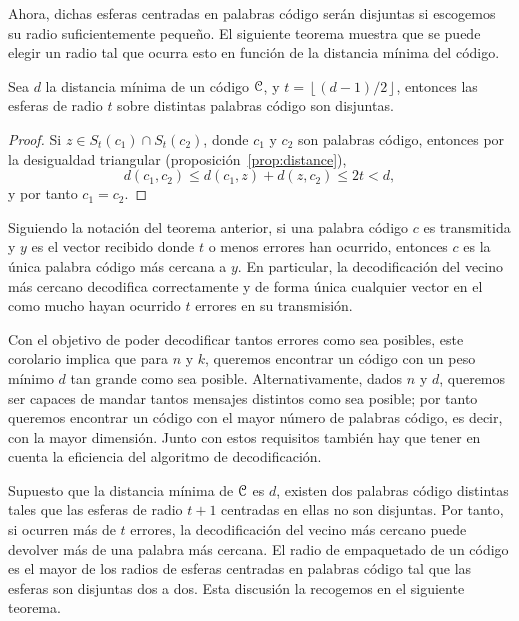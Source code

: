 Ahora, dichas esferas centradas en palabras código serán disjuntas si escogemos su radio suficientemente pequeño. El siguiente teorema muestra que se puede elegir un radio tal que ocurra esto en función de la distancia mínima del código.

\begin{theorem}
\label{th:num_of_errors}
Sea \(d\) la distancia mínima de un código \(\mathcal{C}\), y \(t = \left\lfloor (d-1) / 2 \right\rfloor\), entonces las esferas de radio \(t\) sobre distintas palabras código son disjuntas.
\end{theorem}

\begin{proof}
Si \(z \in S_t(c_1) \cap S_t(c_2)\), donde \(c_1\) y \(c_2\) son palabras código, entonces por la desigualdad triangular (proposición~\ref{prop:distance}),
\[
d(c_1, c_2) \le d(c_1,z) + d(z, c_2) \le 2t < d
,\]
y por tanto \(c_1 = c_2\).
\end{proof}

\begin{corollary} Siguiendo la notación del teorema anterior, si una palabra código \(c\) es transmitida y \(y\) es el vector recibido donde \(t\) o menos errores han ocurrido, entonces \(c\) es la única palabra código más cercana a \(y\). En particular, la decodificación del vecino más cercano decodifica correctamente y de forma única cualquier vector en el como mucho hayan ocurrido \(t\) errores en su transmisión.
\end{corollary}

Con el objetivo de poder decodificar tantos errores como sea posibles, este corolario implica que para \(n\) y \(k\), queremos encontrar un código con un peso mínimo \(d\) tan grande como sea posible. Alternativamente, dados \(n\) y  \(d\), queremos ser capaces de mandar tantos mensajes distintos como sea posible; por tanto queremos encontrar un código con el mayor número de palabras código, es decir, con la mayor dimensión. Junto con estos requisitos también hay que tener en cuenta la eficiencia del algoritmo de decodificación.

Supuesto que la distancia mínima de \(\mathcal{C}\) es \(d\), existen dos palabras código distintas tales que las esferas de radio \(t+1\) centradas en ellas no son disjuntas. Por tanto, si ocurren más de \(t\) errores, la decodificación del vecino más cercano puede devolver más de una palabra más cercana. El radio de empaquetado de un código es el mayor de los radios de esferas centradas en palabras código tal que las esferas son disjuntas dos a dos. Esta discusión la recogemos en el siguiente teorema.

